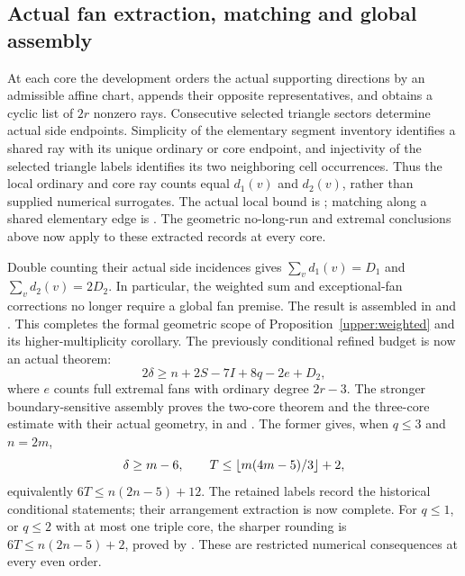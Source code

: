 \subsection{Actual fan extraction, matching and global assembly}
\label{upper:actual-global}

At each core the development orders the actual supporting directions by
an admissible affine chart, appends their opposite representatives, and
obtains a cyclic list of $2r$ nonzero rays. Consecutive selected triangle
sectors determine actual side endpoints. Simplicity of the elementary
segment inventory identifies a shared ray with its unique ordinary or
core endpoint, and injectivity of the selected triangle labels identifies
its two neighboring cell occurrences. Thus the local ordinary and core
ray counts equal $d_1(v)$ and $d_2(v)$, rather than supplied numerical
surrogates. The actual local bound is
;
matching along a shared elementary edge is
.
The geometric no-long-run and extremal conclusions above now apply to
these extracted records at every core.

Double counting their actual side incidences gives
$\sum_vd_1(v)=D_1$ and $\sum_vd_2(v)=2D_2$. In particular, the
weighted sum and exceptional-fan corrections no longer require a global
fan premise. The result is assembled in
and .
This completes the formal geometric scope of
Proposition~\ref{upper:weighted} and its higher-multiplicity corollary.
The previously conditional refined budget is now an actual theorem:
\begin{equation}
 2\delta\ge n+2S-7I+8q-2e+D_2,
 \label{upper:refined-conditional}
\end{equation}
where $e$ counts full extremal fans with ordinary degree $2r-3$.
The stronger boundary-sensitive assembly proves the two-core theorem
and the three-core estimate with their actual geometry, in
and .
The former gives, when $q\le3$ and $n=2m$,
\begin{equation}
 \delta\ge m-6,\qquad T\le\left\lfloor m(4m-5)/3\right\rfloor+2,
 \label{upper:three-core-conditional}
\end{equation}
equivalently $6T\le n(2n-5)+12$. The retained labels record the historical
conditional statements; their arrangement extraction is now complete.
For $q\le1$, or $q\le2$ with at most one triple core, the sharper
rounding is $6T\le n(2n-5)+2$, proved by
.
These are restricted numerical consequences at every even order.

